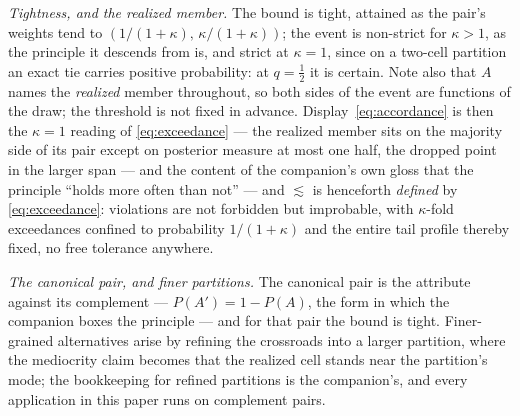 \textit{Tightness, and the realized member.} The bound is tight, attained as the pair's weights tend to $(1/(1+\kappa),\, \kappa/(1+\kappa))$; the event is non-strict for $\kappa > 1$, as the principle it descends from is, and strict at $\kappa = 1$, since on a two-cell partition an exact tie carries positive probability: at $q = \tfrac12$ it is certain. Note also that $A$ names the \emph{realized} member throughout, so both sides of the event are functions of the draw; the threshold is not fixed in advance. Display~\eqref{eq:accordance} is then the $\kappa = 1$ reading of \eqref{eq:exceedance} --- the realized member sits on the majority side of its pair except on posterior measure at most one half, the dropped point in the larger span --- and the content of the companion's own gloss that the principle ``holds more often than not'' \cite{Nexus} --- and $\lesssim$ is henceforth \emph{defined} by \eqref{eq:exceedance}: violations are not forbidden but improbable, with $\kappa$-fold exceedances confined to probability $1/(1+\kappa)$ and the entire tail profile thereby fixed, no free tolerance anywhere.

\textit{The canonical pair, and finer partitions.} The canonical pair is the attribute against its complement --- $P(A') = 1 - P(A)$, the form in which the companion boxes the principle \cite{Nexus} --- and for that pair the bound is tight. Finer-grained alternatives arise by refining the crossroads into a larger partition, where the mediocrity claim becomes that the realized cell stands near the partition's mode; the bookkeeping for refined partitions is the companion's, and every application in this paper runs on complement pairs.

